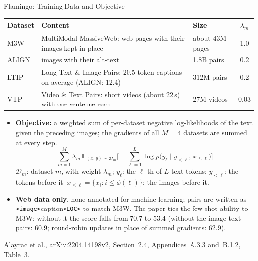 \begin{frame}{Flamingo: Training Data and Objective}

  {\centering\scriptsize
  \begin{tabular}{l p{8.3cm} l c}
    \toprule
    \textbf{Dataset} & \textbf{Content} & \textbf{Size} & $\lambda_m$ \\
    \midrule
    M3W & MultiModal MassiveWeb: web pages with their images kept in place & about 43M pages & 1.0 \\
    ALIGN & images with their alt-text & 1.8B pairs & 0.2 \\
    LTIP & Long Text \& Image Pairs: 20.5-token captions on average (ALIGN: 12.4) & 312M pairs & 0.2 \\
    VTP & Video \& Text Pairs: short videos (about 22\,s) with one sentence each & 27M videos & 0.03 \\
    \bottomrule
  \end{tabular}\par}
  \begin{itemize}\footnotesize\itemsep0.3em
    \item \textbf{Objective:} a weighted sum of per-dataset negative log-likelihoods of the text given the preceding images; the gradients of all $M=4$ datasets are summed at every step.
    \[ \sum_{m=1}^{M} \lambda_m\, \mathbb{E}_{(x,y)\sim\mathcal{D}_m}\Big[-\sum_{\ell=1}^{L}\log p\big(y_\ell \mid y_{<\ell},\, x_{\leq\ell}\big)\Big] \]
    $\mathcal{D}_m$: dataset $m$, with weight $\lambda_m$; $y_\ell$: the $\ell$-th of $L$ text tokens; $y_{<\ell}$: the tokens before it; $x_{\leq\ell}=\{x_i : i\leq\phi(\ell)\}$: the images before it.
    \item \textbf{Web data only}, none annotated for machine learning; pairs are written as \texttt{<image>}caption\texttt{<EOC>} to match M3W. The paper ties the few-shot ability to M3W: without it the score falls from 70.7 to 53.4 (without the image-text pairs: 60.9; round-robin updates in place of summed gradients: 62.9).
  \end{itemize}
  \vspace{0.1em}
  {\scriptsize Alayrac et al., \href{https://arxiv.org/abs/2204.14198v2}{arXiv:2204.14198v2}, Section~2.4, Appendices~A.3.3 and~B.1.2, Table~3.\par}
\end{frame}

